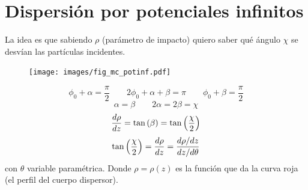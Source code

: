 \documentclass[10pt,oneside]{CBFT_book}
\begin{document}
\section{Dispersión por potenciales infinitos}

La idea es que sabiendo $\rho$ (parámetro de impacto) quiero saber qué ángulo $\chi$ se desvían las
partículas incidentes.
\begin{figure}[htb]
	\begin{center}
	\texttt{[image: images/fig\_mc\_potinf.pdf]}	 
	\end{center}
	\caption{}
\end{figure} 
\[
	\phi_0 + \alpha = \frac{\pi}{2}		\qquad		2 \phi_0 + \alpha + \beta = \pi
	\qquad \phi_0 + \beta = \frac{\pi}{2}
\]
\[
	\alpha = \beta		\qquad 		2\alpha = 2\beta = \chi
\]
\[
	\frac{d^{\hspace{-0.05em}} {\rho}}{d {z}^{\hspace{-0.05em}}} = \tan \left(\beta \right) = \tan\left(\frac{\chi}{2}\right)
\]
\[
	\tan\left(\frac{\chi}{2}\right) = \frac{d^{\hspace{-0.05em}} {\rho}}{d {z}^{\hspace{-0.05em}}} = \frac{ d\rho/dz }{ dz/d\theta }
\]
con $\theta$ variable paramétrica. Donde $\rho = \rho(z)$ es la función que da la curva roja (el perfil
del cuerpo dispersor).




\end{document}
